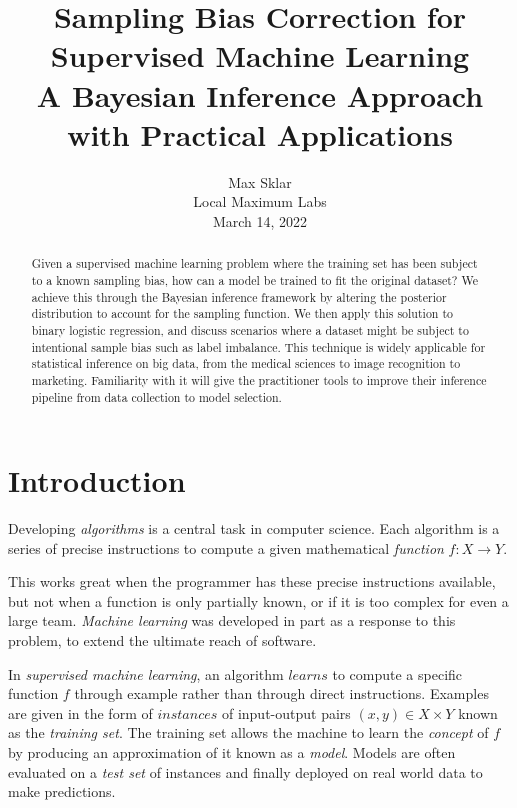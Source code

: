 \documentclass[twoside]{article}
\begin{document}
\parindent=0in
\parskip=12pt


\title{
  Sampling Bias Correction for Supervised Machine Learning \\
  \large{
    A Bayesian Inference Approach with Practical Applications
  }
}

\author{Max Sklar \\ Local Maximum Labs \\ March 14, 2022}
\date{}

\maketitle
\thispagestyle{empty}

\begin{abstract}
Given a supervised machine learning problem where the training set has been subject to a known sampling bias, how can a model be trained to fit the original dataset? We achieve this through the Bayesian inference framework by altering the posterior distribution to account for the sampling function. We then apply this solution to binary logistic regression, and discuss scenarios where a dataset might be subject to intentional sample bias such as label imbalance. This technique is widely applicable for statistical inference on big data, from the medical sciences to image recognition to marketing. Familiarity with it will give the practitioner tools to improve their inference pipeline from data collection to model selection. 
\end{abstract}

\section{Introduction}
\label{section:introduction}

Developing \textit{algorithms} is a central task in computer science. Each algorithm is a series of precise instructions to compute a given mathematical \textit{function} \(f: X \to Y\).

This works great when the programmer has these precise instructions available, but not when a function is only partially known, or if it is too complex for even a large team. \textit{Machine learning} was developed in part as a response to this problem, to extend the ultimate reach of software. 

In \textit{supervised machine learning}, an algorithm \(learns\) to compute a specific function \(f\) through example rather than through direct instructions. Examples are given in the form of \(instances\) of input-output pairs \((x, y) \in X \times Y\) known as the \textit{training set}. The training set allows the machine to learn the \textit{concept} of \(f\) by producing an approximation of it known as a \textit{model}. Models are often evaluated on a \textit{test set} of instances and finally deployed on real world data to make predictions.
\end{document}
